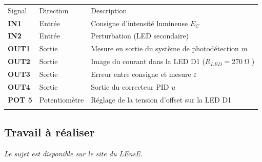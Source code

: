 \begin{center}
\begin{tabular}{|>{\centering\arraybackslash}p{2.5cm}|>{\centering\arraybackslash}p{2.5cm}|>{\centering\arraybackslash}p{10cm}|}
  
  \Xhline{2pt}
  Signal & Direction & Description\\
  \Xhline{2pt}
  \textbf{IN1} & Entrée & Consigne d'intensité lumineuse $E_C$ \\
  \hline
  \textbf{IN2} & Entrée & Perturbation (LED secondaire) \\
  \Xhline{2pt}
  \textbf{OUT1} & Sortie & Mesure en sortie du système de photodétection $m$ \\
  \hline
  \textbf{OUT2} & Sortie & Image du courant dans la LED D1 ($R_{LED} = 270\operatorname{\Omega}$) \\
  \hline
  \textbf{OUT3} & Sortie & Erreur entre consigne et mesure $\varepsilon$ \\
  \hline
  \textbf{OUT4} & Sortie & Sortie du correcteur PID $u$ \\
  \Xhline{2pt}
  \textbf{POT 5} & Potentiomètre & Réglage de la tension d'offset sur la LED D1 \\
  \Xhline{2pt}
\end{tabular}
\end{center}

\bigskip

\subsection{Travail à réaliser}

\textit{Le sujet est disponible sur le site du LEnsE.}